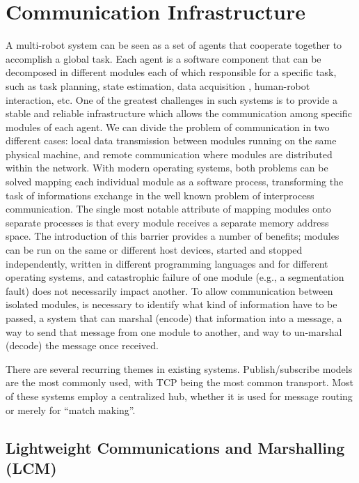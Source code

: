 \section{Communication Infrastructure}


A multi-robot system can be seen as a set of agents that cooperate together to accomplish a global task. Each agent is a software component that can be decomposed in different modules each of which responsible for a specific task, such as task planning, state estimation, data acquisition , human-robot interaction, etc. 
One of the greatest challenges in such systems is to provide a stable and reliable infrastructure which allows the communication among specific modules of each agent.
We can divide the problem of communication in two different cases: local data transmission between  modules running on the same physical machine, and remote communication where modules are distributed within the network.
With modern operating systems, both problems can be solved mapping each individual module as a software process, transforming the task of informations exchange in the well known problem of interprocess communication.
The single most notable attribute of mapping modules onto separate processes is that every module receives a separate memory address space. The introduction of this barrier provides a number of benefits; modules can be run on the same or different host devices, started and stopped independently, written in different programming languages and for different operating systems, and catastrophic failure of one module (e.g., a segmentation fault) does not necessarily impact another. To allow communication between isolated modules, is necessary to identify what kind of information have to be passed,  a system that can marshal (encode) that information into a message, a way to send that message from one module to another, and way to un-marshal (decode) the message once received.

There are several recurring themes in existing systems. Publish/subscribe models are the most commonly used, with TCP being the most common transport. Most of these systems employ a centralized hub, whether it is used for message routing or merely for “match making”. 

\subsection{Lightweight Communications and Marshalling (LCM)}

